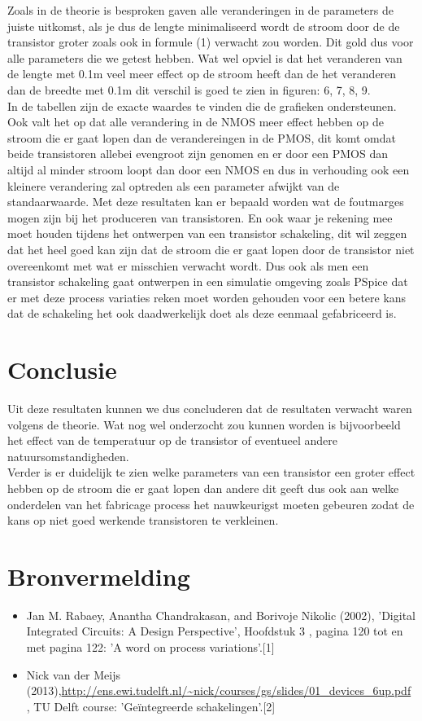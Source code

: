 \documentclass{article}
\begin{document}
Zoals in de theorie is besproken gaven alle veranderingen in de parameters de juiste uitkomst, als je dus de lengte minimaliseerd wordt de stroom door de de transistor groter zoals ook in formule (1) verwacht zou worden. Dit gold dus voor alle parameters die we getest hebben. Wat wel opviel is dat het veranderen van de lengte met 0.1\textmu m veel meer effect op de stroom heeft dan de het veranderen dan de breedte met 0.1\textmu m dit verschil is goed te zien in figuren: 6, 7, 8, 9.\\
In de tabellen zijn de exacte waardes te vinden die de grafieken ondersteunen.\\
Ook valt het op dat alle verandering in de NMOS meer effect hebben op de stroom die er gaat lopen dan de verandereingen in de PMOS, dit komt omdat beide transistoren allebei evengroot zijn genomen en er door een PMOS dan altijd al minder stroom loopt dan door een NMOS en dus in verhouding ook een kleinere verandering zal optreden als een parameter afwijkt van de standaarwaarde.
Met deze resultaten kan er bepaald worden wat de foutmarges mogen zijn bij het produceren van transistoren. En ook waar je rekening mee moet houden tijdens het ontwerpen van een transistor schakeling, dit wil zeggen dat het heel goed kan zijn dat de stroom die er gaat lopen door de transistor niet overeenkomt met wat er misschien verwacht wordt. Dus ook als men een transistor schakeling gaat ontwerpen in een simulatie omgeving zoals PSpice dat er met deze process variaties reken moet worden gehouden voor een betere kans dat de schakeling het ook daadwerkelijk doet als deze eenmaal gefabriceerd is.


\section{Conclusie}

Uit deze resultaten kunnen we dus concluderen dat de resultaten verwacht waren volgens de theorie. Wat nog wel onderzocht zou kunnen worden is bijvoorbeeld het effect van de temperatuur op de transistor of eventueel andere natuursomstandigheden.\\
Verder is er duidelijk te zien welke parameters van een transistor een groter effect hebben op de stroom die er gaat lopen dan andere  dit geeft dus ook aan welke onderdelen van het fabricage process het nauwkeurigst moeten gebeuren zodat de kans op niet goed werkende transistoren te verkleinen.

\section{Bronvermelding}

\begin{itemize}
	\item Jan M. Rabaey, Anantha Chandrakasan, and Borivoje Nikolic (2002), 'Digital Integrated Circuits: A Design Perspective', Hoofdstuk 3 , pagina 120 tot en met pagina 122: 'A word on process variations'.[1]
	\item Nick van der Meijs (2013),\url{http://ens.ewi.tudelft.nl/~nick/courses/gs/slides/01_devices_6up.pdf} , TU Delft course: 'Geïntegreerde schakelingen'.[2]
\end{itemize}
\end{document}
